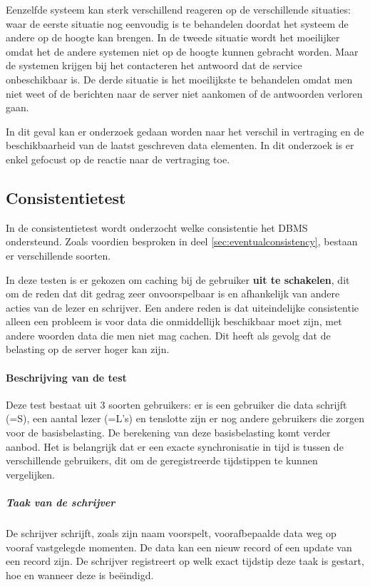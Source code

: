 Eenzelfde systeem kan sterk verschillend reageren op de verschillende situaties: waar de eerste situatie nog eenvoudig is te behandelen doordat het systeem de andere op de hoogte kan brengen. In de tweede situatie wordt het moeilijker omdat het de andere systemen niet op de hoogte kunnen gebracht worden. Maar de systemen krijgen bij het contacteren het antwoord dat de service onbeschikbaar is. De derde situatie is het moeilijkste te behandelen omdat men niet weet of de berichten naar de server niet aankomen of de antwoorden verloren gaan. 

In dit geval kan er onderzoek gedaan worden naar het verschil in vertraging en de beschikbaarheid van de laatst geschreven data elementen. In dit onderzoek is er enkel gefocust op de reactie naar de vertraging toe. 
 
\subsection{Consistentietest}
In de consistentietest wordt onderzocht welke consistentie het DBMS ondersteund. Zoals voordien besproken in deel \ref{sec:eventualconsistency}, bestaan er verschillende soorten. 

In deze testen is er gekozen om caching bij de gebruiker \textbf{uit te schakelen}, dit om de reden dat dit gedrag zeer onvoorspelbaar is en afhankelijk van andere acties van de lezer en schrijver. Een andere reden is dat uiteindelijke consistentie alleen een probleem is voor data die onmiddellijk beschikbaar moet zijn, met andere woorden data die men niet mag cachen. Dit heeft als gevolg dat de belasting op de server hoger kan zijn. 

\paragraph{Beschrijving van de test} Deze test bestaat uit 3 soorten gebruikers: er is een gebruiker die data schrijft (=S), een aantal lezer (=L's) en tenslotte zijn er nog andere gebruikers die zorgen voor de basisbelasting. De berekening van deze basisbelasting komt verder aanbod.  
Het is belangrijk dat er een exacte synchronisatie in tijd is tussen de verschillende gebruikers, dit om de geregistreerde tijdstippen te kunnen vergelijken.


\subparagraph{Taak van de schrijver} De schrijver schrijft, zoals zijn naam voorspelt, voorafbepaalde data weg op vooraf vastgelegde momenten. De data kan een nieuw record of een update van een record zijn. De schrijver registreert op welk exact tijdstip deze taak is gestart, hoe en wanneer deze is beëindigd.

